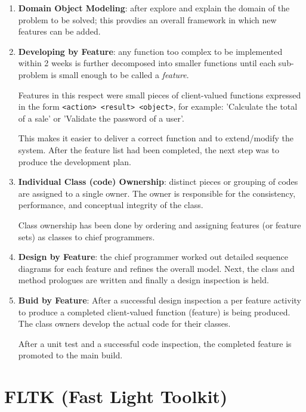 \begin{enumerate}
  \item {\bf Domain Object Modeling}: after explore and explain the domain of
  the problem to be solved; this provdies an overall framework in which new
  features can be added.
  
  \item {\bf Developing by Feature}: any function too complex to be implemented
  within 2 weeks is further decomposed into smaller functions until each
  sub-problem is small enough to be called a {\it feature}. 
  
  Features in this respect were small pieces of client-valued functions
  expressed in the form \verb!<action> <result> <object>!, for example:
  'Calculate the total of a sale' or 'Validate the password of a user'.
  
  This makes it easier to deliver a correct function and to extend/modify the
  system. After the feature list had been completed, the next step was to
  produce the development plan. 
  
  \item {\bf Individual Class (code) Ownership}: distinct pieces or grouping of
  codes are assigned to a single owner. The owner is responsible for the
  consistency, performance, and conceptual integrity of the class.
  
  Class ownership has been done by ordering and assigning features (or feature
  sets) as classes to chief programmers.
  
  \item {\bf Design by Feature}: 
  the chief programmer worked out detailed sequence diagrams for each feature
  and refines the overall model. Next, the class and method prologues are written and finally a design inspection is held.
  
  \item {\bf Buid by Feature}: After a successful design inspection a per
  feature activity to produce a completed client-valued function (feature) is
  being produced. The class owners develop the actual code for their classes. 
  
  
  After a unit test and a successful code inspection, the completed feature is
   promoted to the main build.
  
  
\end{enumerate}

\section{FLTK (Fast Light Toolkit)}
\label{sec:FLTK}

